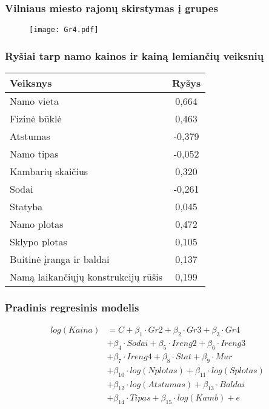 \documentclass[utf8,hyperref={unicode}]{beamer}
\theoremstyle{change}\newtheorem{teorema}{Teiginys}
\theoremstyle{change}\newtheorem{salyga}{}
\begin{document}
\begin{frame}
    \frametitle{Vilniaus miesto rajonų skirstymas į grupes}
    \begin{figure}[H]
  \centering
    \texttt{[image: Gr4.pdf]} 
\end{figure}
\end{frame}

\begin{frame}
    \frametitle{ Ryšiai tarp namo kainos ir kainą lemiančių veiksnių}
  \begin{table}[H]
        \begin{center}
        \begin{tabular}{ | p{} | c |}
       \hline
       \textbf{Veiksnys} & \textbf{Ryšys} \\ \hline
    Namo vieta & 0,664\\ \hline
    Fizinė būklė & 0,463 \\ \hline
    Atstumas & -0,379 \\ \hline
    Namo tipas & -0,052 \\ \hline
    Kambarių skaičius & 0,320 \\ \hline
    Sodai & -0,261 \\ \hline
    Statyba & 0,045 \\ \hline
    Namo plotas & 0,472 \\ \hline
    Sklypo plotas & 0,105 \\ \hline
    Buitinė įranga ir baldai & 0,137 \\ \hline
    Namą laikančiųjų konstrukcijų rūšis & 0,199 \\ \hline
    \end{tabular}
\end{center}
\end{table} 
\end{frame}

\begin{frame}
    \frametitle{Pradinis regresinis modelis}   
\begin{align*}
log(Kaina)&=C+\beta_1\cdot Gr2+\beta_2\cdot  Gr3+\beta_3\cdot Gr4\\&+\beta_4\cdot Sodai+\beta_5\cdot Ireng2+\beta_6\cdot Ireng3\\&+\beta_7\cdot Ireng4+\beta_8\cdot Stat+\beta_9\cdot Mur\\&+\beta_{10}\cdot log(Nplotas)+
\beta_{11}\cdot log(Splotas)\\&+\beta_{12}\cdot log(Atstumas)+ \beta_{13}\cdot Baldai\\&+\beta_{14}\cdot Tipas+\beta_{15}\cdot log(Kamb)+e
\end{align*}

\end{frame}
\end{document}
